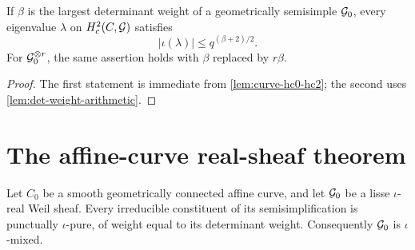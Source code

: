 \begin{corollary}
\label{cor:hc2-upper-det-weight}
If \(\beta\) is the largest determinant weight of a geometrically
semisimple \(\mathcal G_0\), every eigenvalue \(\lambda\) on
\(H_c^2(C,\mathcal G)\) satisfies
\[
  |\iota(\lambda)|\leq q^{(\beta+2)/2}.
\]
For \(\mathcal G_0^{\otimes r}\), the same assertion holds with \(\beta\)
replaced by \(r\beta\).
\end{corollary}

\begin{proof}
The first statement is immediate from
\cref{lem:curve-hc0-hc2}; the second uses
\cref{lem:det-weight-arithmetic}.
\end{proof}

\section{The affine-curve real-sheaf theorem}

\begin{theorem}
\label{thm:real-sheaf-affine-curve}
Let \(C_0\) be a smooth geometrically connected affine curve, and let
\(\mathcal G_0\) be a lisse \(\iota\)-real Weil sheaf.  Every irreducible
constituent of its semisimplification is punctually
\(\iota\)-pure, of weight equal to its determinant weight.  Consequently
\(\mathcal G_0\) is \(\iota\)-mixed.
\end{theorem}

